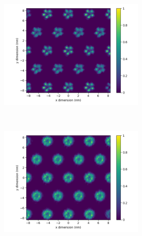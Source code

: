 \documentclass{article}
\begin{document}
  \begin{figure}
  \begin{subfigure}{1\linewidth}
        \centering
        \begin{subfigure}{0.45\linewidth}
                \centering
                \includegraphics[width=\linewidth]{layered_xy_rings.png}
                \caption{}~\label{fig:sandwich_xy}
        \end{subfigure}%
        \begin{subfigure}{0.45\linewidth}
                \centering
                \includegraphics[width=\linewidth]{offset_xy_rings.png}
                \caption{}~\label{fig:offset_xy}
        \end{subfigure}

\end{subfigure}
\end{figure}
\end{document}
